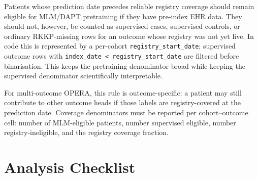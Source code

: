 \documentclass[11pt, a4paper]{article}
\newcommand{\code}[1]{\texttt{\small #1}}
\begin{document}
Patients whose prediction date precedes reliable registry coverage should
remain eligible for MLM/DAPT pretraining if they have pre-index EHR data.
They should not, however, be counted as supervised cases, supervised
controls, or ordinary RKKP-missing rows for an outcome whose registry was
not yet live. In code this is represented by a per-cohort
\code{registry\_start\_date}; supervised outcome rows with
\code{index\_date < registry\_start\_date} are filtered before
binarisation. This keeps the pretraining denominator broad while keeping
the supervised denominator scientifically interpretable.

For multi-outcome OPERA, this rule is outcome-specific: a patient may still
contribute to other outcome heads if those labels are registry-covered at
the prediction date. Coverage denominators must be reported per
cohort--outcome cell: number of MLM-eligible patients, number supervised
eligible, number registry-ineligible, and the registry coverage fraction.

\section{Analysis Checklist}
\end{document}
